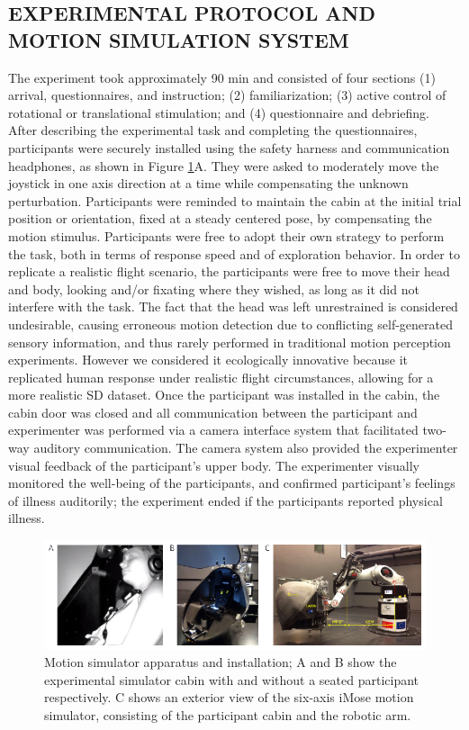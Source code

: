 \documentclass{ieeeaccess}
\begin{document}
\subsection{EXPERIMENTAL PROTOCOL AND MOTION SIMULATION SYSTEM}
The experiment took approximately 90 min and consisted of four sections (1) arrival, questionnaires, and instruction; (2) familiarization; (3) active control of rotational or translational stimulation; and (4) questionnaire and debriefing. After describing the experimental task and completing the questionnaires, participants were securely installed using the safety harness and communication headphones, as shown in Figure \ref{fig3}A. They were asked to moderately move the joystick in one axis direction at a time while compensating the unknown perturbation. Participants were reminded to maintain the cabin at the initial trial position or orientation, fixed at a steady centered pose, by compensating the motion stimulus. Participants were free to adopt their own strategy to perform the task, both in terms of response speed and of exploration behavior. In order to replicate a realistic flight scenario, the participants were free to move their head and body, looking and/or fixating where they wished, as long as it did not interfere with the task. The fact that the head was left unrestrained is considered undesirable, causing erroneous motion detection due to conflicting self-generated sensory information, and thus rarely performed in traditional motion perception experiments. However we considered it ecologically innovative because it replicated human response under realistic flight circumstances, allowing for a more realistic SD dataset. Once the participant was installed in the cabin, the cabin door was closed and all communication between the participant and experimenter was performed via a camera interface system that facilitated two-way auditory communication. The camera system also provided the experimenter visual feedback of the participant's upper body. The experimenter visually monitored the well-being of the participants, and confirmed participant's feelings of illness auditorily; the experiment ended if the participants reported physical illness.

\begin{figure}[htp]
\begin{center}
\includegraphics[width=1.0\linewidth]{figures/figure3.eps}
\end{center}
\caption{Motion simulator apparatus and installation; A and B show the experimental simulator cabin with and without a seated participant respectively. C shows an exterior view of the six-axis iMose motion simulator, consisting of the participant cabin and the robotic arm.}
\label{fig3}
\end{figure}
\end{document}

